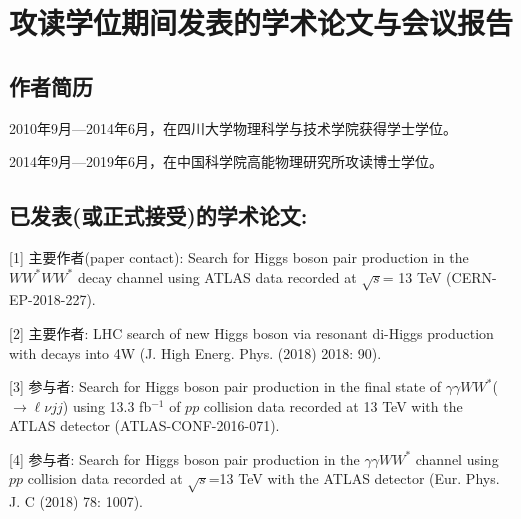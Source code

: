 \chapter{攻读学位期间发表的学术论文与会议报告}

\section*{作者简历}
2010年9月—2014年6月，在四川大学物理科学与技术学院获得学士学位。

2014年9月—2019年6月，在中国科学院高能物理研究所攻读博士学位。




\section*{已发表(或正式接受)的学术论文:}

[1] 主要作者(paper contact): Search for Higgs boson pair production in the $WW^*WW^*$ decay channel using ATLAS data recorded at $\sqrt{s}$= 13 TeV (CERN-EP-2018-227).
 
[2] 主要作者: LHC search of new Higgs boson via resonant di-Higgs production with decays into 4W (J. High Energ. Phys. (2018) 2018: 90). 

[3] 参与者: Search for Higgs boson pair production in the final state of $\gamma\gamma WW^*$($\rightarrow\ell\nu jj$) using 13.3 fb$^{-1}$ of $pp$ collision data recorded at 13 TeV with the ATLAS detector (ATLAS-CONF-2016-071).

[4] 参与者: Search for Higgs boson pair production in the $\gamma\gamma WW^*$ channel using $pp$ collision data recorded at $\sqrt{s}$=13 TeV with the ATLAS detector (Eur. Phys. J. C (2018) 78: 1007).

